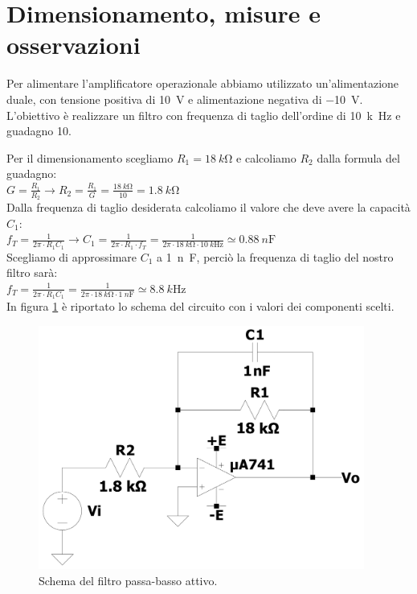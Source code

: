 \documentclass{report}
\begin{document}
\section{Dimensionamento, misure e osservazioni}
Per alimentare l'amplificatore operazionale abbiamo utilizzato un'alimentazione duale, con tensione positiva di \SI{10}{\volt} e alimentazione negativa di \SI{-10}{\volt}. L'obiettivo è realizzare un filtro con frequenza di taglio dell'ordine di \SI{10}{k\hertz} e guadagno 10. \par
\noindent Per il dimensionamento scegliamo $R_1=\SI{18}{k\ohm}$ e calcoliamo $R_2$ dalla formula del guadagno:
\\[2pt]\indent$\displaystyle{G=\frac{R_1}{R_2}\rightarrow R_2=\frac{R_1}{G} = \frac{\SI{18}{k\ohm}}{10}=\SI{1.8}{k\ohm}}$ 
\\[2pt]Dalla frequenza di taglio desiderata calcoliamo il valore che deve avere la capacità $C_1$:
\\[2pt]\indent$\displaystyle{f_T=\frac{1}{2\pi\cdot R_1C_1}\rightarrow C_1=\frac{1}{2\pi\cdot R_1\cdot f_T}=\frac{1}{2\pi\cdot \SI{18}{k\ohm}\cdot \SI{10}{k\hertz}}\simeq\SI{0.88}{n\farad}}$
\\[4pt]Scegliamo di approssimare $C_1$ a \SI{1}{n\farad}, perciò la frequenza di taglio del nostro filtro sarà:
\\[2pt]\indent$\displaystyle{f_T=\frac{1}{2\pi\cdot R_1C_1}=\frac{1}{2\pi\cdot \SI{18}{k\ohm}\cdot \SI{1}{n\farad}}\simeq\SI{8.8}{k\hertz}}$
\\[4pt]In figura \ref{figura:cto_filtro} è riportato lo schema del circuito con i valori dei componenti scelti. 
\begin{figure}[h!]
\centering
\includegraphics[height=8cm]{immagini/cto_filtro}
\caption{Schema del filtro passa-basso attivo.}
\label{figura:cto_filtro}
\end{figure}
\end{document}
